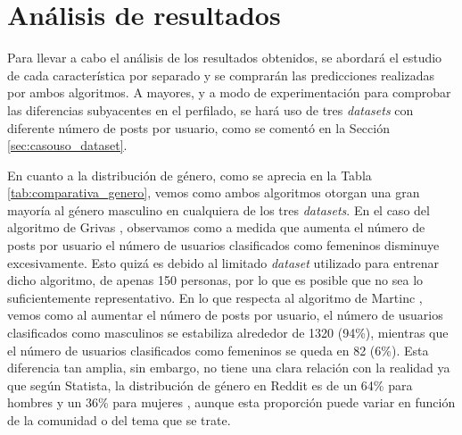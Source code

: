 \section{Análisis de resultados}
\label{sec:casouso_analisis}

Para llevar a cabo el análisis de los resultados obtenidos, se abordará el estudio de cada característica por separado y se
comprarán las predicciones realizadas por ambos algoritmos. A mayores, y a modo de experimentación para comprobar las diferencias subyacentes en el perfilado, 
se hará uso de tres \textit{datasets} con diferente número de posts por usuario, como se comentó en la Sección \ref{sec:casouso_dataset}.

\bigskip
En cuanto a la distribución de género, como se aprecia en la Tabla \ref{tab:comparativa_genero}, vemos como ambos algoritmos otorgan una gran mayoría al género masculino en cualquiera de
los tres \textit{datasets}. En el caso del algoritmo de Grivas \cite{grivas2015author}, observamos como a medida que aumenta el número de posts por usuario
el número de usuarios clasificados como femeninos disminuye excesivamente. Esto quizá es debido al limitado \textit{dataset} utilizado
para entrenar dicho algoritmo, de apenas 150 personas, por lo que es posible que no sea lo suficientemente representativo. En lo que respecta
al algoritmo de Martinc \cite{martinc2019hot}, vemos como al aumentar el número de posts por usuario, el número de usuarios clasificados como masculinos
se estabiliza alrededor de 1320 (94\%), mientras que el número de usuarios clasificados como femeninos se queda en 82 (6\%). Esta diferencia
tan amplia, sin embargo, no tiene una clara relación con la realidad ya que según Statista, la distribución de género en Reddit es
de un 64\% para hombres y un 36\% para mujeres \cite{statistagenero}, aunque esta proporción puede variar en función
de la comunidad o del tema que se trate.

\begin{table}[H]
	\centering
	\caption{Distribución de género obtenida en ambos algoritmos}
	\label{tab:comparativa_genero}
\end{table}

